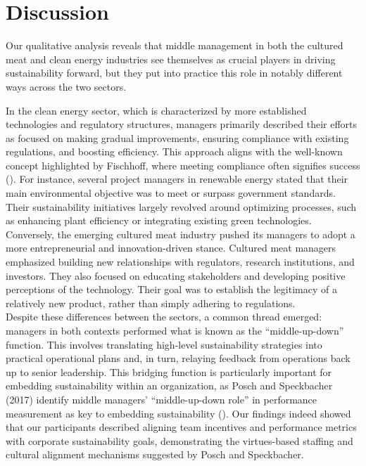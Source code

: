 
	
	\section{Discussion}
	
	Our qualitative analysis reveals that middle management in both the cultured meat and clean energy industries see themselves as crucial players in driving sustainability forward, but they put into practice this role in notably different ways across the two sectors.
	
	In the clean energy sector, which is characterized by more established technologies and regulatory structures, managers primarily described their efforts as focused on making gradual improvements, ensuring compliance with existing regulations, and boosting efficiency. This approach aligns with the well-known concept highlighted by Fischhoff, where meeting compliance often signifies success (\textcite{Fischhoff2024}). For instance, several project managers in renewable energy stated that their main environmental objective was to meet or surpass government standards. Their sustainability initiatives largely revolved around optimizing processes, such as enhancing plant efficiency or integrating existing green technologies. \\
	
	Conversely, the emerging cultured meat industry pushed its managers to adopt a more entrepreneurial and innovation-driven stance. Cultured meat managers emphasized building new relationships with regulators, research institutions, and investors. They also focused on educating stakeholders and developing positive perceptions of the technology. Their goal was to establish the legitimacy of a relatively new product, rather than simply adhering to regulations. \\
	
	Despite these differences between the sectors, a common thread emerged: managers in both contexts performed what is known as the ``middle-up-down'' function. This involves translating high-level sustainability strategies into practical operational plans and, in turn, relaying feedback from operations back up to senior leadership. This bridging function is particularly important for embedding sustainability within an organization, as Posch and Speckbacher (2017) identify middle managers’ ``middle-up-down role'' in performance measurement as key to embedding sustainability (\textcite{Posch2017}). Our findings indeed showed that our participants described aligning team incentives and performance metrics with corporate sustainability goals, demonstrating the virtues-based staffing and cultural alignment mechanisms suggested by Posch and Speckbacher. \\
	
